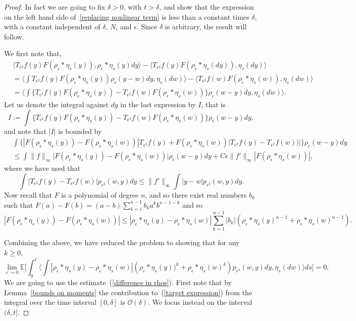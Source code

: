 \documentclass[EJP]{ejpecp} %
\newcommand{\IE}{\mathbb E}
\begin{document}
\begin{proof}
In fact we are going to fix $\delta>0$, with $t>\delta$, and show that
the expression on the left hand side of~\eqref{replacing nonlinear term} is
less than a constant times $\delta$, with a constant independent of $\delta$,
$N$, and $\epsilon$. Since $\delta$ is arbitrary, the result will follow.

We first note that,
\begin{align*}
    &
\langle T_{\epsilon^2} f(y) F(\rho_\epsilon * \eta_s(y)), 
\rho_\epsilon * \eta_s(y) dy \rangle 
-\langle T_{\epsilon^2} f(y) F(\rho_\epsilon *\eta_s(dy)), \eta_s(dy) \rangle 
\\ 
& = 
\langle \int T_{\epsilon^2} f(y) 
F(\rho_\epsilon * \eta_s(y))\rho_\epsilon(y-w) dy, \eta_s(dw)\rangle - \langle 
T_{\epsilon^2} f(w) F(\rho_\epsilon*\eta_s(w)), \eta_s(dw) \rangle 
\\ 
&= 
\langle \int \big\{ T_{\epsilon^2} f(y) F(\rho_\epsilon*\eta_s(y))-T_{\epsilon^2}f(w) 
F(\rho_\epsilon*\eta_s(w))\big\} 
\rho_\epsilon(w-y)dy, \eta_s(dw) \rangle.
\end{align*}
Let us denote the integral against $dy$ in the last expression by $I$, that is 
\[ I :=  \int \{ T_{\epsilon^2} f(y) 
F(\rho_\epsilon*\eta_s(y))-T_{\epsilon^2}f(w) 
F(\rho_\epsilon*\eta_s(w))\} \rho_\epsilon(w-y)dy, \]
and note that $|I|$ is bounded by
\begin{align}
& \int 
\Big\{ |F(\rho_\epsilon*\eta_s(y))-F(\rho_\epsilon*\eta_s(w))|T_{\epsilon^2}f(y)+
F(\rho_\epsilon*\eta_s(w))|T_{\epsilon^2}f(y)-T_{\epsilon^2}f(w))|\Big\} 
\rho_{\epsilon}(w-y)dy
\nonumber \\ &\leq \int \| f\|_{\infty} 
\big|F(\rho_\epsilon*\eta_s(y))-F(\rho_\epsilon*\eta_s(w))\big| \rho_\epsilon(w-y)dy + 
C \epsilon\|f' \|_\infty |F(\rho_\epsilon*\eta_s(w))|, \label{FirstBoundCT}
\end{align}
where we have used that 
\[
\int |T_{\epsilon^2}f(y)-T_{\epsilon^2}f(w)| p_{\epsilon^2}(w,y)dy
\leq \|f'\|_\infty\int|y-w|p_{\epsilon^2}(w,y)dy.
\]
Now recall that $F$ is a polynomial of degree $n$, and so 
there exist real numbers $b_k$ such
that $F(a)-F(b)= (a-b)\sum_{k=1}^{n-1} b_k a^k b^{n-1-k}$ and so 
\[
|F(\rho_\epsilon*\eta_s(y))-F(\rho_\epsilon*\eta_s(w))|
\leq 
|\rho_\epsilon*\eta_s(y)-\rho_\epsilon*\eta_s(w)|
\sum_{k=1}^{n-1}|b_k|\left(\rho_\epsilon*\eta_s(y)^{n-1}+\rho_\epsilon*\eta_s(w)^{n-1}\right).
\]

Combining the above, we have reduced the problem to showing that for any $k \ge 0$,
\begin{equation}
\label{target expression}
	\lim_{\epsilon\to 0}
	\IE\Big[	\int_0^t\big\langle \int |\rho_\epsilon*\eta_s(y)-\rho_\epsilon*\eta_s(w)|
\left(\rho_\epsilon*\eta_s(y))^k+\rho_\epsilon*\eta_s(w)^k\right)
	p_{\epsilon^2}(w,y)dy, \eta_s(dw)\big\rangle ds\Big]
=0 .
\end{equation}
We are going to use the estimate~(\ref{difference in rhos}).
First note that by Lemma~\ref{bounds on moments}
the contribution to~(\ref{target expression}) from the integral over
the time interval $[0,\delta]$ is ${\mathcal O}(\delta)$. 
We focus instead
on the interval $(\delta, t]$.


\end{proof}
\end{document}
